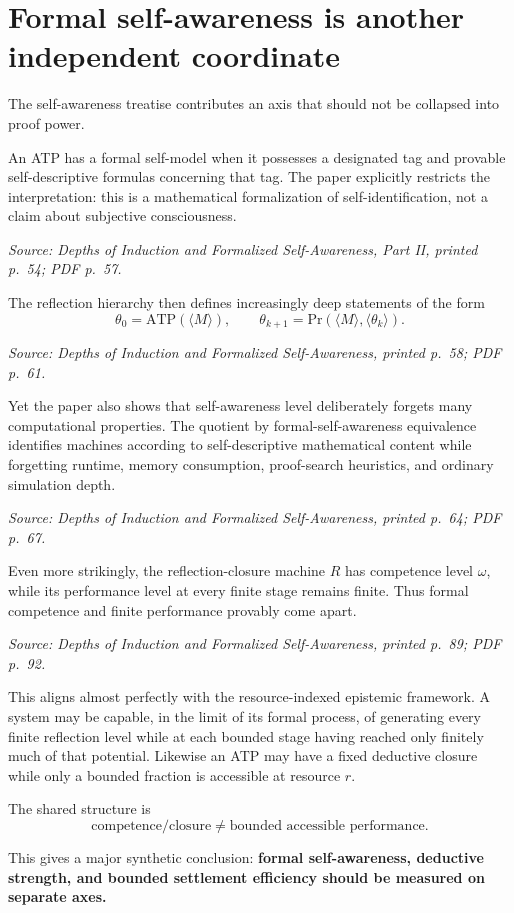 \documentclass[11pt]{article}
\newcommand{\src}[1]{\par\smallskip\noindent\textit{Source: #1}\normalsize}
\begin{document}
\section{Formal self-awareness is another independent coordinate}

The self-awareness treatise contributes an axis that should not be collapsed into proof power.

An ATP has a formal self-model when it possesses a designated tag and provable self-descriptive formulas concerning that tag. The paper explicitly restricts the interpretation: this is a mathematical formalization of self-identification, not a claim about subjective consciousness.
\src{\emph{Depths of Induction and Formalized Self-Awareness}, Part II, printed p.~54; PDF p.~57.}

The reflection hierarchy then defines increasingly deep statements of the form
\[
\theta_0=\mathrm{ATP}(\langle M\rangle),\qquad
\theta_{k+1}=\mathrm{Pr}(\langle M\rangle,\langle\theta_k\rangle).
\]
\src{\emph{Depths of Induction and Formalized Self-Awareness}, printed p.~58; PDF p.~61.}

Yet the paper also shows that self-awareness level deliberately forgets many computational properties. The quotient by formal-self-awareness equivalence identifies machines according to self-descriptive mathematical content while forgetting runtime, memory consumption, proof-search heuristics, and ordinary simulation depth.
\src{\emph{Depths of Induction and Formalized Self-Awareness}, printed p.~64; PDF p.~67.}

Even more strikingly, the reflection-closure machine $R$ has competence level $\omega$, while its performance level at every finite stage remains finite. Thus formal competence and finite performance provably come apart.
\src{\emph{Depths of Induction and Formalized Self-Awareness}, printed p.~89; PDF p.~92.}

This aligns almost perfectly with the resource-indexed epistemic framework. A system may be capable, in the limit of its formal process, of generating every finite reflection level while at each bounded stage having reached only finitely much of that potential. Likewise an ATP may have a fixed deductive closure while only a bounded fraction is accessible at resource $r$.

The shared structure is
\[
\text{competence/closure}\neq\text{bounded accessible performance}.
\]

This gives a major synthetic conclusion: \textbf{formal self-awareness, deductive strength, and bounded settlement efficiency should be measured on separate axes.}
\end{document}
